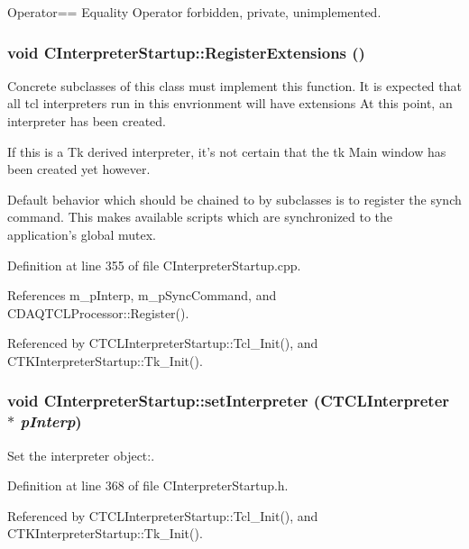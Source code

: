 Operator== Equality Operator forbidden, private, unimplemented.

\subsubsection{\setlength{\rightskip}{0pt plus 5cm}void CInterpreter\-Startup::Register\-Extensions ()\hspace{0.3cm}{\tt  [protected, virtual]}}\label{classCInterpreterStartup_b1}


Concrete subclasses of this class must implement this function. It is expected that all tcl interpreters run in this envrionment will have extensions At this point, an interpreter has been created.

If this is a Tk derived  interpreter, it's not certain that the tk Main window has been created yet however.

Default behavior which should be chained to by subclasses is to register the synch command. This makes available scripts which are synchronized to the application's global mutex. 

Definition at line 355 of file CInterpreter\-Startup.cpp.

References m\_\-p\-Interp, m\_\-p\-Sync\-Command, and CDAQTCLProcessor::Register().

Referenced by CTCLInterpreter\-Startup::Tcl\_\-Init(), and CTKInterpreter\-Startup::Tk\_\-Init().
\subsubsection{\setlength{\rightskip}{0pt plus 5cm}void CInterpreter\-Startup::set\-Interpreter ({\bf CTCLInterpreter} $\ast$ {\em p\-Interp})\hspace{0.3cm}{\tt  [inline, protected]}}\label{classCInterpreterStartup_b2}


Set the interpreter object:.



Definition at line 368 of file CInterpreter\-Startup.h.

Referenced by CTCLInterpreter\-Startup::Tcl\_\-Init(), and CTKInterpreter\-Startup::Tk\_\-Init().

